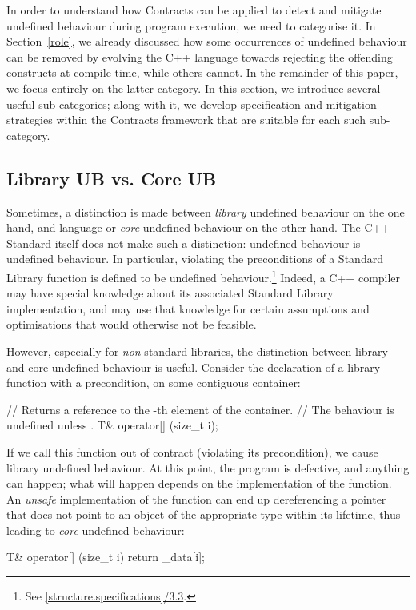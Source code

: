 In order to understand how Contracts can be applied to detect and mitigate undefined behaviour during program execution, we need to categorise it. In Section~\ref{role}, we already discussed how some occurrences of undefined behaviour can be removed by evolving the C++ language towards rejecting the offending constructs at compile time, while others cannot. In the remainder of this paper, we focus entirely on the latter category. In this section, we introduce several useful sub-categories; along with it, we develop specification and mitigation strategies within the Contracts framework that are suitable for each such sub-category.
	
\subsection{Library UB vs. Core UB}

Sometimes, a distinction is made between \emph{library} undefined behaviour on the one hand, and language or \emph{core} undefined behaviour on the other hand. The C++ Standard itself does not make such a distinction: undefined behaviour is undefined behaviour. In particular, violating the preconditions of a Standard Library function is defined to be undefined behaviour.\footnote{See \href{https://timsong-cpp.github.io/cppwp/n4950/library\#structure.specifications-3.3}{[structure.specifications]/3.3}.} Indeed, a C++ compiler may have special knowledge about its associated Standard Library implementation, and may use that knowledge for certain assumptions and optimisations that would otherwise not be feasible. 

However, especially for \emph{non}-standard libraries, the distinction between library and core undefined behaviour is useful. Consider the declaration of a library function with a precondition,  on some contiguous container:
\begin{codeblock}
// Returns a reference to the -th element of the container.
// The behaviour is undefined unless .
T& operator[] (size_t i);
\end{codeblock}
If we call this function out of contract (violating its precondition), we cause library undefined behaviour. At this point, the program is defective, and anything can happen; what will happen depends on the implementation of the function. An \emph{unsafe} implementation of the function can end up dereferencing a pointer that does not point to an object of the appropriate type within its lifetime, thus leading to \emph{core} undefined behaviour:
\begin{codeblock}
T& operator[] (size_t i) {
  return _data[i];
}
\end{codeblock}


